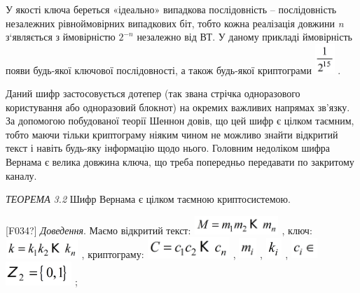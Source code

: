 \documentclass[a4paper]{article}
\newcounter{}
\begin{document}
У якості ключа береться «ідеально» випадкова послідовність – послідовність
незалежних рівноймовірних випадкових біт, тобто кожна реалізація довжини 
\textit{n }з‘являється з ймовірністю  ${2^{{-n}}}$ незалежно від ВТ. У даному
прикладі ймовірність появи будь-якої ключової послідовності, а також будь-якої
криптограми  
\includegraphics[width=0.2917in,height=0.4437in]{crypt-img/crypt-img26.png} .

Даний шифр застосовується дотепер (так звана стрічка одноразового користування
або одноразовий блокнот) на окремих важливих напрямах зв’язку. За допомогою
побудованої теорії Шеннон  довів, що цей шифр  є цілком таємним, тобто маючи
тільки криптограму  ніяким чином не можливо знайти відкритий текст і навіть
будь-яку інформацію щодо нього. Головним недоліком шифра Вернама є велика
довжина ключа, що треба попередньо передавати по закритому каналу. 


\bigskip

\textit{ТЕОРЕМА }\textit{3}\textit{.2  }Шифр Вернама є цілком таємною
криптосистемою.

\textlatin{[F034?]} \textit{Доведення}. Маємо відкритий текст: 
\includegraphics[width=1.2591in,height=0.2709in]{crypt-img/crypt-img27.png} ,
ключ: 
\includegraphics[width=1.0827in,height=0.2791in]{crypt-img/crypt-img28.png} ,
криптограму: 
\includegraphics[width=1.2283in,height=0.3146in]{crypt-img/crypt-img29.png} , 
\includegraphics[width=0.2591in,height=0.3063in]{crypt-img/crypt-img30.png} , 
\includegraphics[width=0.2402in,height=0.3118in]{crypt-img/crypt-img31.png} , 
\includegraphics[width=0.3929in,height=0.3126in]{crypt-img/crypt-img32.png} 
\includegraphics[width=0.9835in,height=0.3547in]{crypt-img/crypt-img33.png} ;
\end{document}
